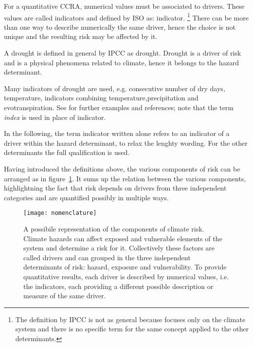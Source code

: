 For a quantitative \gls{CCRA}, numerical values must be associated to \glspl{driver}. These values are called \glspl{indicator} and defined by \gls{ISO} as: \glsdesc{indicator}.%
\footnote{The definition by \gls{IPCC} is not as general because focuses only on the climate system and there is no specific term for the same concept applied to the other \glspl{determinant}.}
There can be more than one way to describe numerically the same \gls{driver}, hence the choice is not unique and the resulting risk may be affected by it.
\begin{example}
  A \gls{drought} is defined in general by \gls{IPCC} as \glsdesc{drought}. Drought is a \gls{driver} of \gls{risk} and is a physical phenomena related to climate, hence it belongs to the \gls{hazard} \gls{determinant}.
  
  Many \glspl{indicator} of drought are used, e.g. consecutive number of dry days, temperature, indicators combining temperature,precipitation and evotranspiration. See \cite[167-169]{2012FieldManagingThe} for further examples and references; note that the term \emph{index} is used in place of indicator.
\end{example}
In the following, the term \gls{indicator} written alone refers to an \gls{indicator} of a \gls{driver} within the \gls{hazard} \gls{determinant}, to relax the lenghty wording. For the other \glspl{determinant} the full qualification is used.

Having introduced the definitions above, the various components of \gls{risk} can be arranged as in figure~\ref{fig:nomenclature}. It sums up the relation between the various components, highlightning the fact that risk depends on drivers from three independent categories and are quantified possibly in multiple ways.

\begin{figure}[h]
  \centering
  \texttt{[image: nomenclature]}
  \caption{A possibile representation of the components of climate risk. Climate hazards can affect exposed and vulnerable elements of the system and determine a risk for it. Collectively these factors are called drivers and can grouped in the three independent determinants of risk: hazard, exposure and vulnerability. To provide quantitative results, each driver is described by numerical values, i.e. the indicators, each providing a different possible description or measure of the same driver.}
  \label{fig:nomenclature}
\end{figure}



